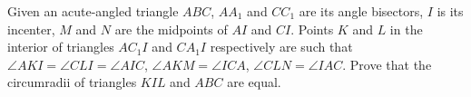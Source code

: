 Given an acute-angled triangle $ABC$,  $AA_1$ and $CC_1$ are its angle bisectors, $I$ is its incenter, $M$ and $N$ are the midpoints of $AI$ and $CI$. Points $K$ and $L$ in the interior of triangles $AC_1I$ and $CA_1I$ respectively are such that $\angle AKI = \angle CLI = \angle AIC$,  $\angle AKM = \angle ICA$,  $\angle CLN = \angle IAC$. Prove that the circumradii of triangles $KIL$ and $ABC$ are equal.
